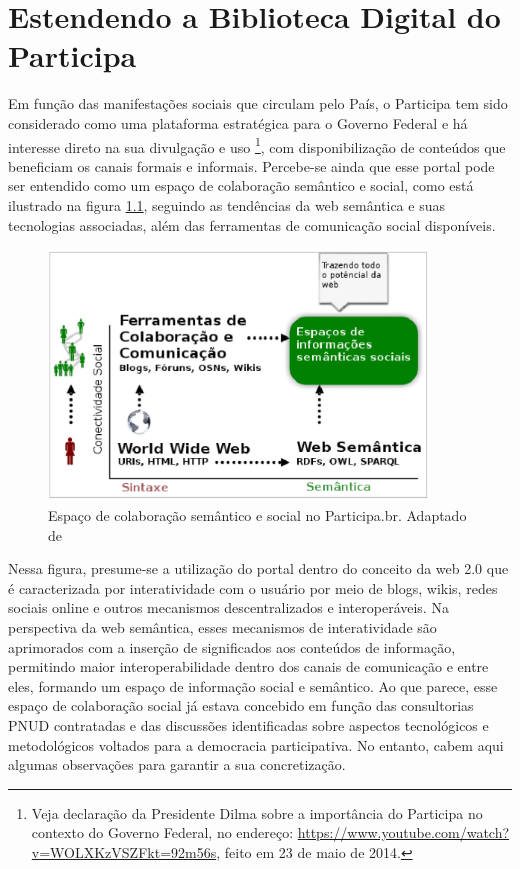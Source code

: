 \chapter{Estendendo a Biblioteca Digital do Participa}
\label{cap:extbibparticipa}

Em função das manifestações sociais que circulam pelo País, o Participa tem sido considerado como uma plataforma estratégica para o Governo Federal e há interesse direto na sua divulgação e uso \footnote{Veja declaração da Presidente Dilma sobre a importância do Participa no contexto do Governo Federal, no endereço: \url{https://www.youtube.com/watch?v=WOLXKzVSZFkt=92m56s}, feito em 23 de maio de 2014.}, com disponibilização de conteúdos que beneficiam os canais formais e informais. Percebe-se ainda que esse portal pode ser entendido como um espaço de colaboração semântico e  social, como está ilustrado na figura \ref{fig:semanticoparticipa}, seguindo as tendências da web semântica e suas tecnologias associadas, além das ferramentas de comunicação social disponíveis.

\graphicspath{{figuras/}}
\begin{figure}[H]
\centering
\includegraphics[width=0.9\textwidth]{semantico_participa}
\caption[Espaço de colaboração semântico e social no Participa.br]{Espaço de colaboração semântico e social no Participa.br. Adaptado de \cite{kruk2006libraries}}
\label{fig:semanticoparticipa}
\end{figure}

Nessa figura, presume-se a utilização do portal dentro do conceito da web 2.0 que é caracterizada por interatividade com o usuário por meio de blogs, wikis, redes sociais online e outros mecanismos descentralizados e interoperáveis. Na perspectiva da web semântica, esses mecanismos de interatividade são aprimorados com a inserção de significados aos conteúdos de informação, permitindo maior interoperabilidade dentro dos canais de comunicação e entre eles, formando um espaço de informação social e semântico. Ao que parece, esse espaço de colaboração social já estava concebido em função das consultorias PNUD contratadas e das discussões identificadas sobre aspectos tecnológicos e metodológicos voltados para a democracia participativa. No entanto, cabem aqui algumas observações para garantir a sua concretização.

